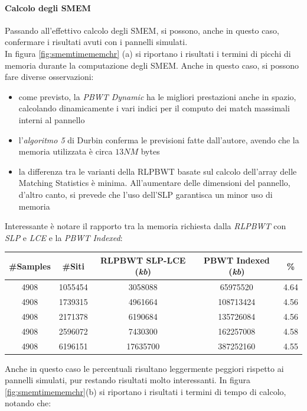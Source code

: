 \paragraph{Calcolo degli SMEM}
Passando all'effettivo calcolo degli SMEM, si possono, anche in questo caso,
confermare i risultati avuti con i pannelli simulati.\\
In figura \ref{fig:smemtimememchr} (a) si riportano i risultati i termini di
picchi di 
memoria durante la computazione degli SMEM. Anche in questo caso, si possono fare
diverse osservazioni:
\begin{itemize}
  \item come previsto, la \textit{PBWT Dynamic} ha le migliori prestazioni anche
  in spazio, calcolando dinamicamente i vari indici per il computo dei match
  massimali interni al pannello
  \item l'\textit{algoritmo 5} di Durbin conferma le previsioni fatte
  dall'autore, avendo che la memoria utilizzata è circa $13NM$ bytes
  \item la differenza tra le varianti della RLPBWT basate sul calcolo dell'array
  delle Matching Statistics è minima. All'aumentare delle dimensioni del
  pannello, d'altro canto, si prevede che l'uso dell'SLP garantisca un minor uso
  di memoria
\end{itemize}
Interessante è notare il rapporto tra la memoria richiesta dalla \textit{RLPBWT}
con \textit{SLP} e \textit{LCE} e la \textit{PBWT Indexed}:
\begin{table}[H]
  \centering
  \footnotesize
  \begin{tabular}{c|c|c|c|c}
    \textbf{\#Samples} & \textbf{\#Siti}
    & \textbf{RLPBWT SLP-LCE (\textit{kb})}
    & \textbf{PBWT Indexed (\textit{kb})} & \textbf{\%}\\
    \hline
    4908 & 1055454 & 3058088 & 65975520 & 4.64\\
    4908 & 1739315 & 4961664 & 108713424 & 4.56\\
    4908 & 2171378 & 6190684 & 135726084 & 4.56\\
    4908 & 2596072 & 7430300 & 162257008 & 4.58\\
    4908 & 6196151 & 17635700 & 387252160 & 4.55
  \end{tabular}
\end{table}
Anche in questo caso le percentuali risultano leggermente peggiori rispetto ai
pannelli simulati, pur restando risultati molto interessanti.
In figura \ref{fig:smemtimememchr}(b) si riportano i risultati i termini di tempo di
calcolo, notando che:
